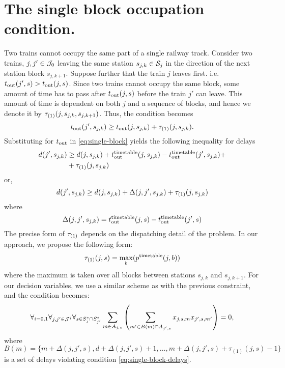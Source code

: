 \section{The single block occupation condition.}
Two trains cannot occupy the same part of a single railway track. Consider two
trains, $j, j' \in \mathcal{J}_0$ leaving the same station $s_{j,k} \in \mathcal{S}_j$ in the direction of the
next station block $s_{j,k+1}$. Suppose further that the train $j$ leaves
first. i.e. $t_\text{out}(j', s) > t_\text{out}(j, s)$. Since two trains cannot occupy the
same block, some amount of time has to pass after $t_\text{out}(j, s)$ before the
train $j'$ can leave. This amount of time is dependent on both $j$ and a
sequence of blocks, and hence we denote it by $\tau_{(1)}(j, s_{j,k}, s_{j,k+1})$. Thus,
the condition becomes
\begin{equation}
  \label{eq:single-block}
  t_\text{out}(j', s_{j,k}) \ge t_\text{out}(j, s_{j,k}) + \tau_{(1)}(j, s_{j,k}).
\end{equation}
Substituting for $t_\text{out}$ in \eqref{eq:single-block} yields the following
inequality for delays
\begin{equation}
\begin{split}
  \label{eq:single-block-delays}
  d(j', s_{j,k}) &\ge d(j, s_{j,k}) + t_\text{out}^\text{timetable}(j, s_{j,k}) - t_\text{out}^\text{timetable}(j', s_{j,k}) + \\
  &+\tau_{(1)}(j, s_{j,k})
\end{split}
\end{equation}
or,
\begin{equation}
  d(j', s_{j,k}) \ge d(j, s_{j,k}) + \Delta(j, j',s_{j,k}) + \tau_{(1)}(j, s_{j,k})
\end{equation}
where
\begin{equation}
  \label{eq:delta}
  \Delta(j, j', s_{j,k}) = t_\text{out}^\text{timetable}(j, s) - t_\text{out}^\text{timetable}(j', s)
\end{equation}
The precise form of $\tau_{(1)}$ depends on the dispatching detail of the problem.
In our approach, we propose the following form:
\begin{equation}
  \tau_{(1)}(j, s) = \max_{b}(p^\text{timetable}(j,b))
\end{equation}
where the maximum is taken over all blocks between stations $s_{j,k}$ and $s_{j,k+1}$.
For our decision variables, we use a similar scheme as with the previous
constraint, and the condition becomes:
\begin{equation}
  \label{eq:qubo:singleblock}
  \forall_{i=0,1} \forall_{j, j' \in \mathcal{J}^{i}} \forall_{s \in S^{*}_{j} \cap S^{*}_{j'}} \sum_{m \in A_{j, s}} \left(
  \sum_{m' \in B(m) \cap A_{j', s}} x_{j,s,m}x_{j',s,m'}
  \right) = 0,
\end{equation}
where $B(m) = \{m + \Delta(j, j', s), d + \Delta(j, j', s)+ 1,\ldots, m +
    \Delta(j, j', s) + \tau_{(1)}(j,s)-1 \}$ is a set of delays
violating condition \eqref{eq:single-block-delays}.

